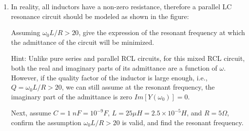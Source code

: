 \begin{enumerate}
\item In reality, all inductors have a non-zero resistance, therefore a 
parallel LC resonance circuit should be modeled as shown in the figure:


Assuming $\omega_0 L/R >20$, give the expression of the resonant 
frequency at which the admittance of the circuit will be minimized.  

Hint: Unlike pure series and parallel RCL circuits, for this mixed RCL
circuit, both the real and imaginary parts of its admittance are a function 
of $\omega$. However, if the quality factor of the inductor is large enough,
i.e., $Q=\omega_0 L/R > 20$, we can still assume at the resonant frequency,
the imaginary part of the admittance is zero $Im[Y(\omega_0)]=0$.

Next, assume $C=1\;nF=10^{-9}F$, $L=25 \mu H=2.5\times 10^{-5}H$, and 
$R=5\Omega$, confirm the assumption $\omega_0 L/R >20$ is valid, and find 
the resonant frequency.

% 
%  

%
% 


\end{enumerate}
